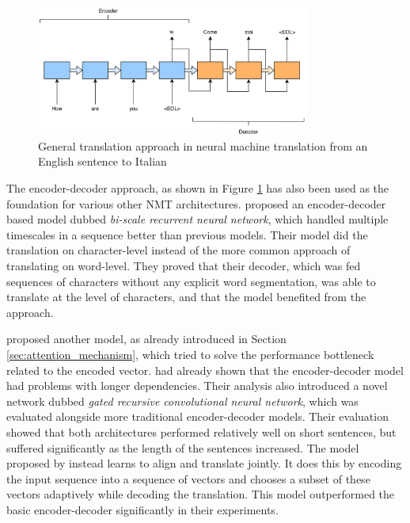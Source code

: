 \begin{figure}[ht]
    \centering
    \includegraphics[width=0.8\textwidth]{fig/related_work/encoder_decoder_en_it.png}
    \captionsetup{justification=centering}
    \caption{General translation approach in neural machine translation from an English sentence to Italian}
    \label{fig:machine-translation-encoder-decoder-simple}
\end{figure}

The encoder-decoder approach, as shown in Figure \ref{fig:machine-translation-encoder-decoder-simple} has also been used as the foundation for various other NMT architectures. \cite{chung2016character} proposed an encoder-decoder based model dubbed \emph{bi-scale recurrent neural network}, which handled multiple timescales in a sequence better than previous models. Their model did the translation on character-level instead of the more common approach of translating on word-level. They proved that their decoder, which was fed sequences of characters without any explicit word segmentation, was able to translate at the level of characters, and that the model benefited from the approach. 

\cite{bahdanau2014neural} proposed another model, as already introduced in Section \ref{sec:attention_mechanism}, which tried to solve the performance bottleneck related to the encoded vector. \cite{cho2014properties} had already shown that the encoder-decoder model had problems with longer dependencies. Their analysis also introduced a novel network dubbed \textit{gated recursive convolutional neural network}, which was evaluated alongside more traditional encoder-decoder models. Their evaluation showed that both architectures performed relatively well on short sentences, but suffered significantly as the length of the sentences increased. The model proposed by \cite{bahdanau2014neural} instead learns to align and translate jointly. It does this by encoding the input sequence into a sequence of vectors and chooses a subset of these vectors adaptively while decoding the translation. This model outperformed the basic encoder-decoder significantly in their experiments.

